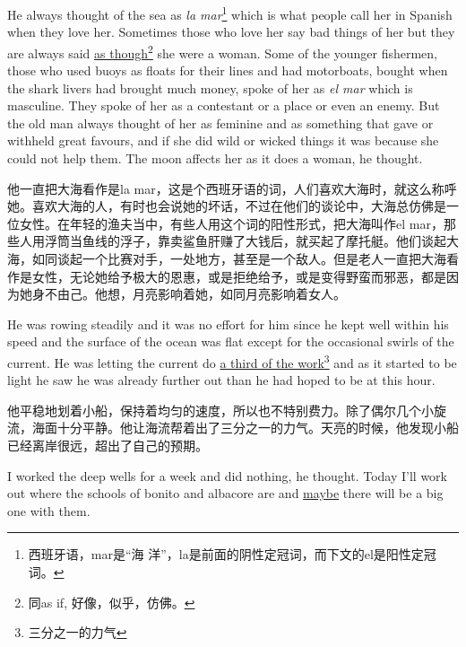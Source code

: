 \begin{paracol}{2}
He always thought of the sea as \emph{la mar}\footnote{西班牙语，mar是“海
  洋”，la是前面的阴性定冠词，而下文的el是阳性定冠词。} which is what people
call her in Spanish when they love her. Sometimes those who love her say bad
things of her but they are always said \uline{as though}\footnote{同as if,
  好像，似乎，仿佛。} she were a woman. Some of
the younger fishermen, those who used \glspl{buoy} as \glspl{float} for
their lines and had motorboats, bought when the shark livers had brought
much money, spoke of her as \emph{el mar} which is \gls{masculine}. They
spoke of her as a \gls{contestant} or a place or even an \gls{enemy}. But
the old man always thought of her as \gls{feminine} and as something that
gave or \gls{withheld} great \glspl{favour}, and if she did wild or
\gls{wicked} things it was because she could not help them. The moon
\glspl{affect} her as it does a woman, he thought.

\switchcolumn

他一直把大海看作是la mar，这是个西班牙语的词，人们喜欢大海时，就这么称呼她。喜欢大海的人，有时也会说她的坏话，不过在他们的谈论中，大海总仿佛是一位女性。在年轻的渔夫当中，有些人用这个词的阳性形式，把大海叫作el mar，那些人用浮筒当鱼线的浮子，靠卖鲨鱼肝赚了大钱后，就买起了摩托艇。他们谈起大海，如同谈起一个比赛对手，一处地方，甚至是一个敌人。但是老人一直把大海看作是女性，无论她给予极大的恩惠，或是拒绝给予，或是变得野蛮而邪恶，都是因为她身不由己。他想，月亮影响着她，如同月亮影响着女人。

\switchcolumn*

He was rowing \gls{steadily} and it was no \gls{effort} for him \gls{since} he kept well
within his speed and the surface of the ocean was flat except for the
\gls{occasional} swirls of the current. He was letting the current do \uline{a third of
the work}\footnote{三分之一的力气} and as it started to be light he saw he was already further out
than he had hoped to be at this hour.

\switchcolumn

他平稳地划着小船，保持着均匀的速度，所以也不特别费力。除了偶尔几个小旋流，海面十分平静。他让海流帮着出了三分之一的力气。天亮的时候，他发现小船已经离岸很远，超出了自己的预期。

\switchcolumn*

I worked the deep wells for a week and did nothing, he thought. Today I'll
work out where the schools of \gls{bonito} and \gls{albacore} are and
\uline{maybe} there will be a big one with them.

\switchcolumn


\end{paracol}
